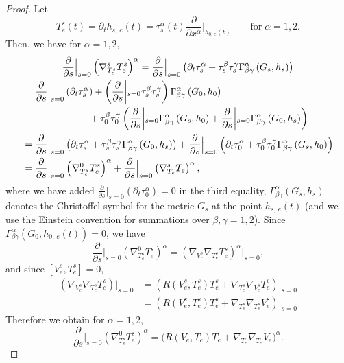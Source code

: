 \documentclass[11pt]{article}
\theoremstyle{definition}
\numberwithin{equation}{section}
\renewcommand{\a}{\alpha}
\renewcommand{\b}{\beta}
\newcommand{\g}{\gamma}
\renewcommand{\t}{\tau}
\newcommand{\p}{\psi}
\renewcommand*\p{\partial}
\begin{document}
\begin{proof}
Let
\[
T_e^s(t)=\p_t h_{s,\,e}(t)=\tau^\a_s(t)\frac{\p}{\p x^\a}\Big|_{h_{0,\,e}(t)} \qquad \text{for}\;\a=1, 2.
\]
Then, we have for $\alpha=1,2$,
\begin{multline}\label{c4}
\frac{\p}{\p s}\Big|_{s=0}\left(\nabla^s_{T_e^s}T_e^s\right)^{\alpha} =\frac{\p}{\p s}\Big|_{s=0}\left(\p_t \t_s^{\alpha}+\t_s^{\beta}\t_s^{\gamma}\Gamma_{\beta\gamma}^{\alpha}\left(G_s, h_s\right)\right)\\
\begin{aligned}
&=\frac{\p}{\p s}\Big|_{s=0}\left(\p_t \t_s^{\alpha}\right)+\left(\frac{\p}{\p s}\middle|_{s=0}\t_s^{\beta}\t_s^{\gamma}\right)\Gamma_{\beta\gamma}^{\alpha}\left(G_0, h_0\right)\\
&\mkern124mu +\t_0^{\beta}\t_0^{\gamma}\left(\frac{\p}{\p s}\middle|_{s=0}\Gamma_{\beta\gamma}^{\alpha}\left(G_s, h_0\right)+\frac{\p}{\p s}\middle|_{s=0}\Gamma_{\beta\gamma}^{\alpha}\left(G_0, h_s\right)\right)\\
&=\frac{\p}{\p s}\Big|_{s=0}\left(\p_t \t_s^{\alpha}+\t_s^{\beta}\t_s^{\gamma}\Gamma_{\beta\gamma}^{\alpha}\left(G_0,h_s\right)\right)+\frac{\p}{\p s}\Big|_{s=0}\left(\p_t \t_0^{\alpha}+\t_0^{\beta}\t_0^{\gamma}\Gamma_{\beta\gamma}^{\alpha}\left(G_s, h_0\right)\right)\\
&=\frac{\p}{\p s}\Big|_{s=0}\left(\nabla^0_{T_e^s}T_e^s\right)^{\alpha}+\frac{\p}{\p s}\Big|_{s=0}\left(\nabla^s_{T_e}T_e\right)^{\alpha},
\end{aligned}
\end{multline}
where we have added $\frac{\p}{\p s}|_{s=0}(\p_t \t_0^{\alpha})=0$ in the third equality, $\Gamma_{\beta\gamma}^{\alpha}(G_s, h_s)$ denotes the Christoffel symbol for the metric $G_s$ at the point $h_{s,\,e}(t)$ (and we use the Einstein convention for summations over $\b, \g=1, 2$). Since $\Gamma_{\beta\gamma}^{\alpha}(G_0, h_{0,\,e}(t))=0$, we have
\[
\frac{\p}{\p s}\Big|_{s=0}\left(\nabla^0_{T_e^s}T_e^s\right)^{\alpha}=\left(\nabla_{V_e^s}\nabla_{T_e^s}T_e^s\right)^\a|_{s=0},
\]
and since $[V_e^s, T_e^s]=0$,
\begin{align*}
\left(\nabla_{V_e^s}\nabla_{T_e^s}T_e^s\right)\big|_{s=0} &=\left(R\left(V_e^s, T_e^s\right)T_e^s+\nabla_{T_e^s}\nabla_{V_e^s}T_e^s\right)\big|_{s=0}\\
&=\left(R\left(V_e^s, T_e^s\right)T_e^s+\nabla_{T_e^s}\nabla_{T_e^s}V_e^s\right)\big|_{s=0}
\end{align*}
Therefore we obtain for $\a=1, 2$,
\begin{equation}\label{c41}
\frac{\p}{\p s}\Big|_{s=0}\left(\nabla^0_{T_e^s}T_e^s\right)^{\alpha}=\big(R\left(V_e, T_e\right)T_e+\nabla_{T_e}\nabla_{T_e}V_e\big)^\a.
\end{equation}




\end{proof}
\end{document}
